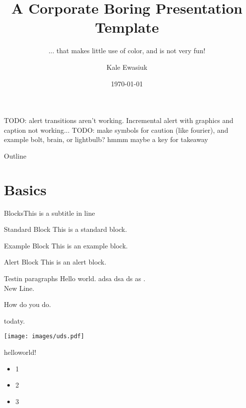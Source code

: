 \documentclass{corpborepres}
\author{Kale Ewasiuk}
\title{A Corporate Boring Presentation\\Template}
\subtitle{... that makes little use of color, and is not very fun!}
\institute{Grid Infrastructure Planning Dept.}
\date{\today}
\begin{document}
	\begin{frame}[plain]
		TODO: alert transitions aren't working.
		Incremental alert with graphics and caption not working...
		TODO: make symbols for caution (like fourier), and example bolt, brain, or lightbulb? hmmm maybe a key for takeaway
	\end{frame}


	\begin{frame}[plain]
		\titlepage
	\end{frame}

	\begin{frame}{Outline}
		\tableofcontents
	\end{frame}

	\section{Basics}

	\subtitleINline
	\begin{frame}{Blocks}{This is a subtitle in line}

		\begin{block}{Standard Block}
			This is a standard block. 
		\end{block}

		\begin{exampleblock}{Example Block}
			This is an example block.
		\end{exampleblock}

		\begin{alertblock}{\Llap{\danger\ }Alert Block}
			This is an alert block.
		\end{alertblock}
	\end{frame}
	\subtitleNEWline
	\begin{frame}{Testin paragraphs}
		Hello world. adsa dsa ds as .\\New Line.

		How do you do.

		todaty.
	\end{frame}

\begin{frame}
		\texttt{[image: images/uds.pdf]}
\end{frame}


\begin{frame}
 	\begColFF
		hello\hfill world!
	\nextColFF
	\begin{itemize}
            \item 1
            \item 2
            \item 3
         \end{itemize}
	\endColFF
\end{frame}
\end{document}
